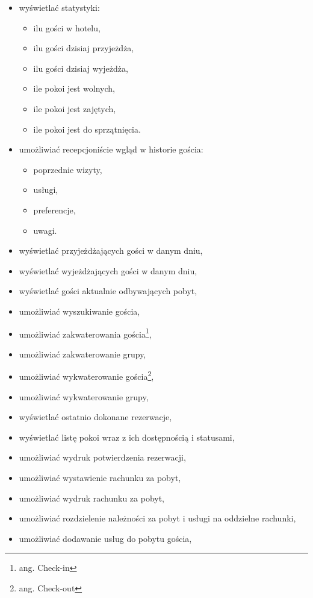 \documentclass[a4paper,onecolumn,oneside,11pt,wide,floatssmall]{mwrep}
\theoremstyle{definition}
\theoremstyle{plain}%
\theoremstyle{remark}
\begin{document}
\begin{enumerate}
\begin{itemize}
      \item wyświetlać statystyki:
        \begin{itemize}
          \item ilu gości w hotelu,
          \item ilu gości dzisiaj przyjeżdża,
          \item ilu gości dzisiaj wyjeżdża,
          \item ile pokoi jest wolnych,
          \item ile pokoi jest zajętych,
          \item ile pokoi jest do sprzątnięcia.
        \end{itemize}
      \item umożliwiać recepcjoniście wgląd w historie gościa:
        \begin{itemize}
          \item poprzednie wizyty,
          \item usługi,
          \item preferencje,
          \item uwagi.
        \end{itemize}
      \item wyświetlać przyjeżdżających gości w danym dniu,
      \item wyświetlać wyjeżdżających gości w danym dniu,
      \item wyświetlać gości aktualnie odbywających pobyt,
      \item umożliwiać wyszukiwanie gościa,
      \item umożliwiać zakwaterowania gościa\footnote{ang. Check-in},
      \item umożliwiać zakwaterowanie grupy,
      \item umożliwiać wykwaterowanie gościa\footnote{ang. Check-out},
      \item umożliwiać wykwaterowanie grupy,
      \item wyświetlać ostatnio dokonane rezerwacje,
      \item wyświetlać listę pokoi wraz z ich dostępnością i statusami,
      \item umożliwiać wydruk potwierdzenia rezerwacji,
      \item umożliwiać wystawienie rachunku za pobyt,
      \item umożliwiać wydruk rachunku za pobyt,
      \item umożliwiać rozdzielenie należności za pobyt i usługi na oddzielne rachunki,
      \item umożliwiać dodawanie usług do pobytu gościa,

\end{itemize}
\end{enumerate}
\end{document}
